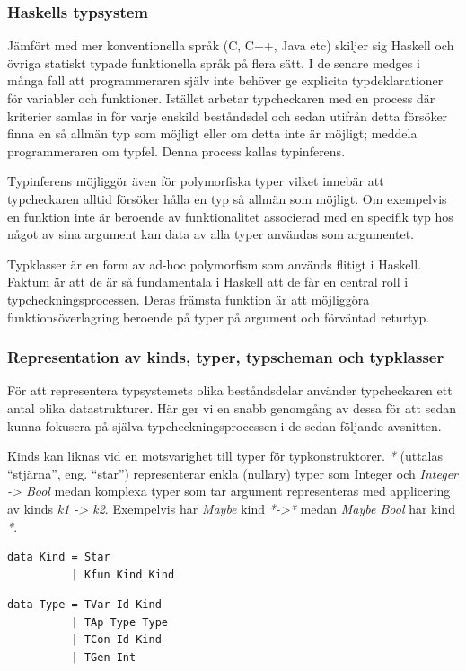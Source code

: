 \subsubsection{Haskells typsystem}
Jämfört med mer konventionella språk (C, C++, Java etc) skiljer sig Haskell
och övriga statiskt typade funktionella språk på flera sätt. I de senare
medges i många fall att programmeraren själv inte behöver ge explicita
typdeklarationer för variabler och funktioner. Istället arbetar typcheckaren
med en process där kriterier samlas in för varje enskild beståndsdel och
sedan utifrån detta försöker finna en så allmän typ som möjligt eller om
detta inte är möjligt; meddela programmeraren om typfel. Denna process
kallas typinferens.

Typinferens möjliggör även för polymorfiska typer vilket innebär att
typcheckaren alltid försöker hålla en typ så allmän som möjligt. Om
exempelvis en funktion inte är beroende av funktionalitet associerad med en
specifik typ hos något av sina argument kan data av alla typer användas som
argumentet.

Typklasser är en form av ad-hoc polymorfism som används flitigt i
Haskell. Faktum är att de är så fundamentala i Haskell att de får en central
roll i typcheckningsprocessen. Deras främsta funktion är att möjliggöra funktionsöverlagring beroende på typer på argument och förväntad returtyp.

\subsubsection{Representation av kinds, typer, typscheman och typklasser}
För att representera typsystemets olika beståndsdelar använder typcheckaren ett antal olika datastrukturer. Här ger vi en snabb genomgång av dessa för att sedan kunna fokusera på själva typcheckningsprocessen i de sedan följande avsnitten. 

Kinds kan liknas vid en motsvarighet till typer för typkonstruktorer. \emph{*} (uttalas ``stjärna'', eng. ``star'') representerar enkla (nullary) typer som Integer och \emph{Integer -> Bool} medan komplexa typer som tar argument representeras med applicering av kinds \emph{k1 -> k2}. Exempelvis har \emph{Maybe} kind \emph{*->*} medan \emph{Maybe Bool} har kind \emph{*}.

\begin{lstlisting}
data Kind = Star
          | Kfun Kind Kind
\end{lstlisting}


\begin{lstlisting}
data Type = TVar Id Kind
          | TAp Type Type
          | TCon Id Kind
          | TGen Int     
\end{lstlisting}

